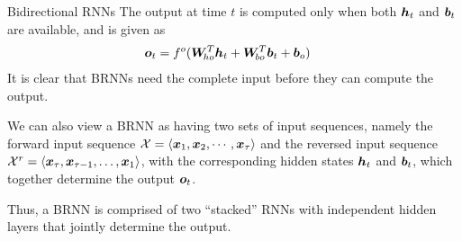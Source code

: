 \begin{frame}{Bidirectional RNNs}
The output at time $t$ is computed only when both ${\boldsymbol h}_t$ and ${\boldsymbol b}_t$
are available, and is given as
\begin{align*}
    {\boldsymbol o}_t & = f^o({\boldsymbol W}_{\!ho}^T {\boldsymbol h}_t + 
    {\boldsymbol W}_{\!bo}^T {\boldsymbol b}_{t} + {\boldsymbol b}_{o})
\end{align*}
It is clear that BRNNs need the complete input before they can compute
the output. 

\medskip

We can also view a BRNN as having two sets of input sequences, namely
the forward input sequence ${\mathcal X} = \langle {\boldsymbol x}_1, {\boldsymbol x}_2, \cdots, {\boldsymbol x}_\tau \rangle$ and the
reversed input sequence ${\mathcal X}^r = \langle {\boldsymbol x}_\tau, {\boldsymbol x}_{\tau-1}, \ldots,
{\boldsymbol x}_1 \rangle$, with the corresponding hidden states ${\boldsymbol h}_t$ and ${\boldsymbol b}_t$, which
together determine the output ${\boldsymbol o}_t$. 

\medskip

Thus, a BRNN is comprised of two
``stacked'' RNNs with independent hidden layers 
that jointly determine the output. 
\end{frame}
%
